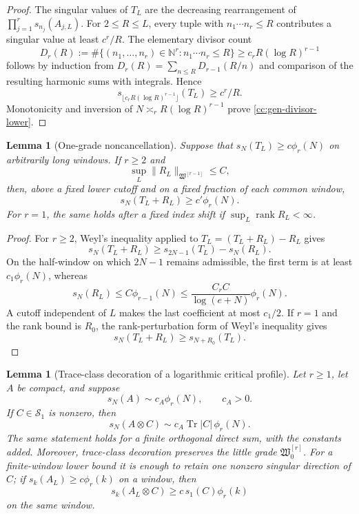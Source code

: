 \documentclass[10pt,reqno]{amsart}
\theoremstyle{plain}
\newtheorem{lemma}[theorem]{Lemma}
\theoremstyle{definition}
\theoremstyle{remark}
\begin{document}
\begin{proof}
The singular values of \(T_L\) are the decreasing rearrangement of
\(\prod_{j=1}^rs_{n_j}(A_{j,L})\).  For \(2\leq R\leq L\), every tuple
with \(n_1\cdots n_r\leq R\) contributes a singular value at least
\(c^r/R\).  The elementary divisor count
\[
 D_r(R):=
 \#\{(n_1,\ldots,n_r)\in\mathbb N^r:n_1\cdots n_r\leq R\}
 \geq c_rR(\log R)^{r-1}
\]
follows by induction from
\(D_r(R)=\sum_{n\leq R}D_{r-1}(R/n)\) and comparison of the resulting
harmonic sums with integrals.  Hence
\[
 s_{\lfloor c_rR(\log R)^{r-1}\rfloor}(T_L)\geq c^r/R.
\]
Monotonicity and inversion of
\(N\asymp_rR(\log R)^{r-1}\) prove
\eqref{cc:gen-divisor-lower}.
\end{proof}

\begin{lemma}[One-grade noncancellation]
\label{cc:gen-lemma-one-grade-noncancellation}
Suppose that
\(s_N(T_L)\geq c\phi_r(N)\) on arbitrarily long windows.
If \(r\geq2\) and
\[
 \sup_L\|R_L\|_{\mathfrak W^{[r-1]}}\leq C,
\]
then, above a fixed lower cutoff and on a fixed fraction of each common
window,
\[
 s_N(T_L+R_L)\geq c'\phi_r(N).
\]
For \(r=1\), the same holds after a fixed index shift if
\(\sup_L\operatorname{rank}R_L<\infty\).
\end{lemma}

\begin{proof}
For \(r\geq2\), Weyl's inequality applied to
\(T_L=(T_L+R_L)-R_L\) gives
\[
 s_N(T_L+R_L)\geq s_{2N-1}(T_L)-s_N(R_L).
\]
On the half-window on which \(2N-1\) remains admissible, the first term
is at least \(c_1\phi_r(N)\), whereas
\[
 s_N(R_L)\leq C\phi_{r-1}(N)
 \leq\frac{C_rC}{\log(e+N)}\phi_r(N).
\]
A cutoff independent of \(L\) makes the last coefficient at most
\(c_1/2\).  If \(r=1\) and the rank bound is \(R_0\), the
rank-perturbation form of Weyl's inequality gives
\[
 s_N(T_L+R_L)\geq s_{N+R_0}(T_L).
\]
\end{proof}



\begin{lemma}[Trace-class decoration of a logarithmic critical profile]
\label{cc:lem-trace-decoration-tauberian}
Let $r\ge1$, let $A$ be compact, and suppose
\begin{equation}
 s_N(A)\sim c_A\phi_r(N),\qquad c_A>0.
 \label{cc:eq-decoration-base-asymptotic}
\end{equation}
If $C\in\mathcal S_1$ is nonzero, then
\begin{equation}
 s_N(A\otimes C)\sim c_A\operatorname{Tr}|C|\,\phi_r(N).
 \label{cc:eq-trace-decoration-asymptotic}
\end{equation}
The same statement holds for a finite orthogonal direct sum, with the
constants added.  Moreover, trace-class decoration preserves the little grade
$\mathfrak W^{[r]}_0$.  For a finite-window lower bound it is enough to retain
one nonzero singular direction of $C$; if $s_k(A_L)\ge c\phi_r(k)$ on a
window, then
\[
 s_k(A_L\otimes C)\ge c\,s_1(C)\phi_r(k)
\]
on the same window.
\end{lemma}
\end{document}
